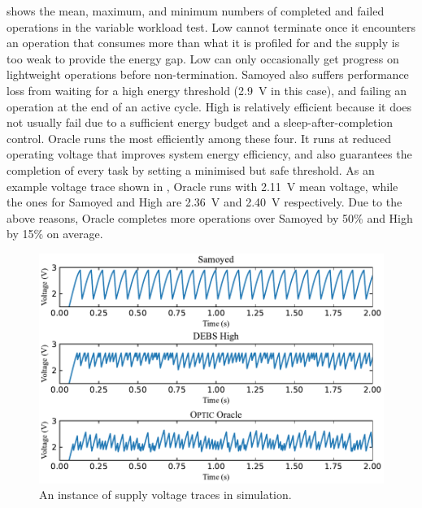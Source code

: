 %

 shows the mean, maximum, and minimum numbers of completed and failed operations in the variable workload test. 
\debs{} Low cannot terminate once it encounters an operation that consumes more than what it is profiled for and the supply is too weak to provide the energy gap. 
\debs{} Low can only occasionally get progress on lightweight operations before non-termination. 
Samoyed also suffers performance loss from waiting for a high energy threshold (\SI{2.9}{\volt} in this case), and failing an operation at the end of an active cycle. 
\debs{} High is relatively efficient because it does not usually fail due to a sufficient energy budget and a sleep-after-completion control. 
\nn{} Oracle runs the most efficiently among these four.
It runs at reduced operating voltage that improves system energy efficiency, and also guarantees the completion of every task by setting a minimised but safe threshold.
As an example voltage trace shown in , \nn{} Oracle runs with \SI{2.11}{\volt} mean voltage, while the ones for Samoyed and \debs{} High are \SI{2.36}{\volt} and \SI{2.40}{\volt} respectively. 
Due to the above reasons, \nn{} Oracle completes more operations over Samoyed by 50\% and \debs{} High by 15\% on average.



\begin{figure}
    \centering
    \includegraphics[width=\columnwidth]{ch5_optic/figures/voltage_traces.pdf}
    \caption{An instance of supply voltage traces in simulation. }
    \label{fig:simulation_voltage}
\end{figure}

